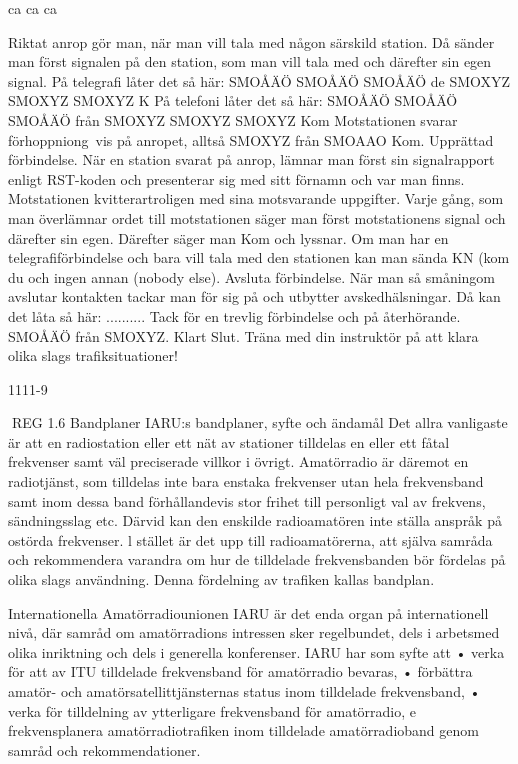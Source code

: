 ca ca ca

Riktat anrop gör man, när man vill tala med
någon särskild station. Då sänder man först
signalen på den station, som man vill tala
med och därefter sin egen signal.
På telegrafi låter det så här:
SMOÅÄÖ SMOÅÄÖ SMOÅÄÖ de SMOXYZ
SMOXYZ SMOXYZ K
På telefoni låter det så här:
SMOÅÄÖ SMOÅÄÖ SMOÅÄÖ från SMOXYZ
SMOXYZ SMOXYZ Kom
Motstationen svarar förhoppniong~vis på
anropet, alltså SMOXYZ från SMOAAO Kom.
Upprättad förbindelse. När en station svarat
på anrop, lämnar man först sin signalrapport
enligt RST-koden och presenterar sig med
sitt förnamn och var man finns. Motstationen
kvitterartroligen med sina motsvarande uppgifter. Varje gång, som man överlämnar ordet till motstationen säger man först motstationens signal och därefter sin egen. Därefter säger man Kom och lyssnar. Om man
har en telegrafiförbindelse och bara vill tala
med den stationen kan man sända KN (kom
du och ingen annan (nobody else).
Avsluta förbindelse. När man så småningom
avslutar kontakten tackar man för sig på och
utbytter avskedhälsningar.
Då kan det låta så här:
.......... Tack för en trevlig förbindelse och på
återhörande. SMOÅÄÖ från SMOXYZ. Klart
Slut.
Träna med din instruktör på att klara olika
slags trafiksituationer!

1111-9

REG
1.6 Bandplaner
IARU:s bandplaner, syfte och ändamål
Det allra vanligaste är att en radiostation eller
ett nät av stationer tilldelas en eller ett fåtal
frekvenser samt väl preciserade villkor i övrigt. Amatörradio är däremot en radiotjänst,
som tilldelas inte bara enstaka frekvenser
utan hela frekvensband samt inom dessa
band förhållandevis stor frihet till personligt
val av frekvens, sändningsslag etc.
Därvid kan den enskilde radioamatören
inte ställa anspråk på ostörda frekvenser. l
stället är det upp till radioamatörerna, att
själva samråda och rekommendera varandra om hur de tilldelade frekvensbanden bör
fördelas på olika slags användning. Denna
fördelning av trafiken kallas bandplan.

Internationella Amatörradiounionen IARU är det enda organ på internationell
nivå, där samråd om amatörradions intressen sker regelbundet, dels i arbetsmed olika inriktning och dels i
generella konferenser.
IARU har som syfte att
• verka för att av ITU tilldelade frekvensband för amatörradio bevaras,
• förbättra amatör- och amatörsatellittjänsternas status inom tilldelade
frekvensband,
• verka för tilldelning av ytterligare
frekvensband för amatörradio,
e
frekvensplanera amatörradiotrafiken
inom tilldelade amatörradioband genom samråd och rekommendationer.

